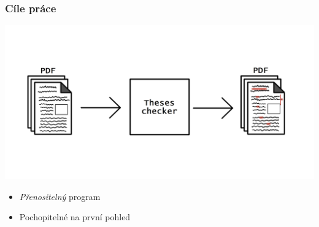 




\begin{frame}
  \frametitle{Cíle práce}
  \includegraphics[width=\textwidth]{img/Theses_checker_diagram2.png}
  \begin{itemize}
    \item \emph{Přenositelný} program
    \item Pochopitelné na první pohled
  \end{itemize}
\end{frame}



